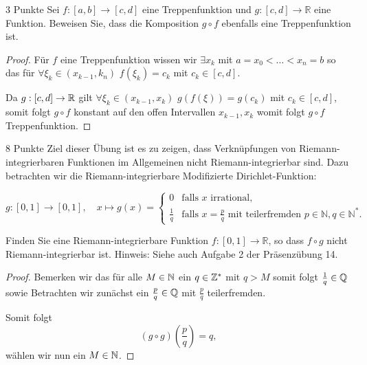 \documentclass{problemset}
\begin{document}
\begin{problem}{3 Punkte}
Sei $f: [a, b] \to [c, d]$ eine Treppenfunktion und $g: [c, d] \to \mathbb{R}$ eine Funktion. Beweisen Sie, dass die Komposition $g \circ f$ ebenfalls eine Treppenfunktion ist.


\begin{proof}
    Für $f$ eine Treppenfunktion wissen wir $\exists x_k$ mit $a = x_0 < \dots < x_n = b$ so das für $\forall \xi_k \in (x_{k-1}, k_n)$ $f(\xi_k) = c_k$ mit $c_k \in [c,d]$.

    Da $g: [c,d] \rightarrow \mathbb{R}$ gilt $\forall \xi_k \in (x_{k-1}, x_k)$ $g(f(\xi)) = g(c_k)$ mit $c_k \in [c,d]$, somit folgt $g \circ f$ konstant auf den offen Intervallen $x_{k-1}, x_k$ womit folgt $g \circ f$ Treppenfunktion.
\end{proof}


\end{problem}

\begin{problem}{8 Punkte}
Ziel dieser Übung ist es zu zeigen, dass Verknüpfungen von Riemann-integrierbaren Funktionen im Allgemeinen nicht Riemann-integrierbar sind. Dazu betrachten wir die Riemann-integrierbare Modifizierte Dirichlet-Funktion:

\[ g: [0, 1] \to [0, 1], \quad x \mapsto g(x) = \begin{cases}
        0           & \text{falls } x \text{ irrational},                                                            \\
        \frac{1}{q} & \text{falls } x = \frac{p}{q} \text{ mit teilerfremden } p \in \mathbb{N}, q \in \mathbb{N}^*.
    \end{cases} \]

Finden Sie eine Riemann-integrierbare Funktion $f: [0, 1] \to \mathbb{R}$, so dass $f \circ g$ nicht Riemann-integrierbar ist. Hinweis: Siehe auch Aufgabe 2 der Präsenzübung 14.

\begin{proof}
    Bemerken wir das für alle $M \in \mathbb{N}$ ein $q \in \mathbb{Z}^*$ mit $q > M$ somit folgt $\frac{1}{q} \in \mathbb{Q}$ sowie
    Betrachten wir zunächst ein $\frac{p}{q} \in \mathbb{Q}$ mit $\frac{p}{q}$ teilerfremden.

    Somit folgt \[
        (g \circ g)\left(\frac{p}{q}\right) = q,
    \] wählen wir nun ein $M \in \mathbb{N}$.
\end{proof}

\end{problem}
\end{document}
